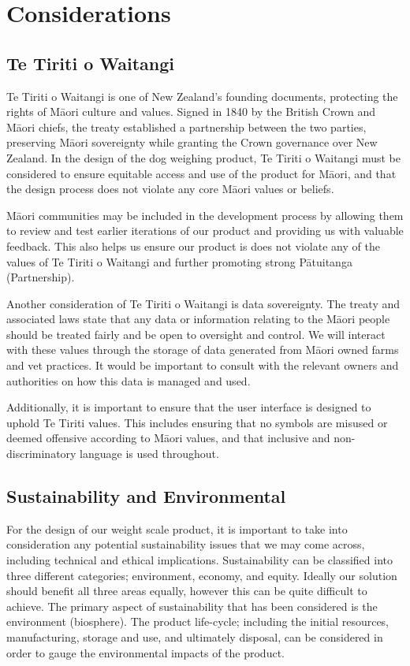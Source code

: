 \chapter{Considerations}
\section{Te Tiriti o Waitangi}
Te Tiriti o Waitangi is one of New Zealand’s founding documents, protecting the rights of Māori culture and values. Signed in 1840 by the British Crown and Māori chiefs, the treaty established a partnership between the two parties, preserving Māori sovereignty while granting the Crown governance over New Zealand. In the design of the dog weighing product, Te Tiriti o Waitangi must be considered to ensure equitable access and use of the product for Māori, and that the design process does not violate any core Māori values or beliefs. 

Māori communities may be included in the development process by allowing them to review and test earlier iterations of our product and providing us with valuable feedback. This also helps us ensure our product is does not violate any of the values of Te Tiriti o Waitangi and further promoting strong Pātuitanga (Partnership).

Another consideration of Te Tiriti o Waitangi is data sovereignty. The treaty and associated laws state that any data or information relating to the Māori people should be treated fairly and be open to oversight and control. We will interact with these values through the storage of data generated from Māori owned farms and vet practices. It would be important to consult with the relevant owners and authorities on how this data is managed and used.

Additionally, it is important to ensure that the user interface is designed to uphold Te Tiriti values. This includes ensuring that no symbols are misused or deemed offensive according to Māori values, and that inclusive and non-discriminatory language is used throughout.


\section{Sustainability and Environmental}
For the design of our weight scale product, it is important to take into consideration any potential sustainability issues that we may come across, including technical and ethical implications. Sustainability can be classified into three different categories; environment, economy, and equity. Ideally our solution should benefit all three areas equally, however this can be quite difficult to achieve. The primary aspect of sustainability that has been considered is  the environment (biosphere). The product life-cycle; including the initial resources, manufacturing, storage and use, and ultimately disposal, can be considered in order to gauge the environmental impacts of the product.


